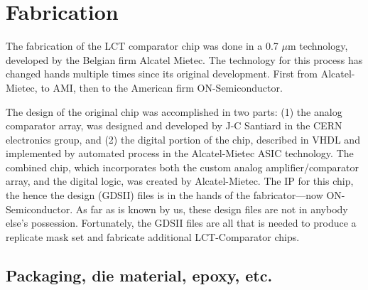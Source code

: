 \documentclass[letterpaper]{article}
\begin{document}
%

\section {Fabrication}

The fabrication of the LCT comparator chip was done in a 0.7 ${\mu}$m technology, developed by the Belgian firm Alcatel Mietec. The technology for this process has changed hands multiple times since its original development. First from Alcatel-Mietec, to AMI, then to the American firm ON-Semiconductor.

The design of the original chip was accomplished in two parts: (1) the analog comparator array, was designed and developed by J-C Santiard in the CERN electronics group, and (2) the digital portion of the chip, described in VHDL and implemented by automated process in the Alcatel-Mietec ASIC technology.  The combined chip, which incorporates both the custom analog amplifier/comparator array, and the digital logic, was created by Alcatel-Mietec. The IP for this chip, the hence the design (GDSII) files is in the hands of the fabricator---now ON-Semiconductor. As far as is known by us, these design files are not in anybody else's possession.  Fortunately, the GDSII files are all that is needed to produce a replicate mask set and fabricate additional LCT-Comparator chips.


\subsection{Packaging, die material, epoxy, etc.}
\end{document}

